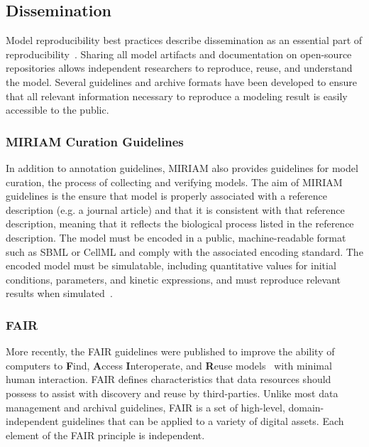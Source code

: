 \documentclass[12pt]{report}
\begin{document}
\subsection{Dissemination}
Model reproducibility best practices describe dissemination as an essential part of reproducibility~\cite{porubsky_best_2020}. Sharing all model artifacts and documentation on open-source repositories allows independent researchers to reproduce, reuse, and understand the model. Several guidelines and archive formats have been developed to ensure that all relevant information necessary to reproduce a modeling result is easily accessible to the public.


\subsubsection{MIRIAM Curation Guidelines}
In addition to annotation guidelines, MIRIAM also provides guidelines for model curation, the process of collecting and verifying models. The aim of MIRIAM guidelines is the ensure that model is properly associated with a reference description (e.g. a journal article) and that it is consistent with that reference description, meaning that it reflects the biological process listed in the reference description. The model must be encoded in a public, machine-readable format such as SBML or CellML and comply with the associated encoding standard. The encoded model must be simulatable, including quantitative values for initial conditions, parameters, and kinetic expressions, and must reproduce relevant results when simulated~\cite{novere_minimum_2005}.

\subsubsection{FAIR}
More recently, the FAIR guidelines were published to improve the ability of computers to \textbf{F}ind, \textbf{A}ccess \textbf{I}nteroperate, and \textbf{R}euse models~\cite{Wilkinson2016} with minimal human interaction. FAIR defines characteristics that data resources should possess to assist with discovery and reuse by third-parties. Unlike most data management and archival guidelines, FAIR is a set of high-level, domain-independent guidelines that can be applied to a variety of digital assets. Each element of the FAIR principle is independent. 
\end{document}
